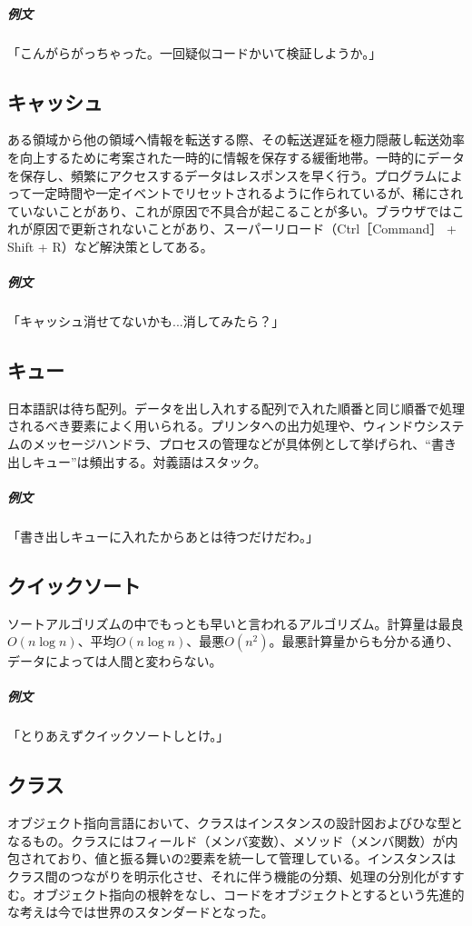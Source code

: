 \documentclass[dvipdfmx,jb5]{jreport}
\begin{document}
\subparagraph{例文} 「こんがらがっちゃった。一回疑似コードかいて検証しようか。」

\subsection{キャッシュ}
ある領域から他の領域へ情報を転送する際、その転送遅延を極力隠蔽し転送効率を向上するために考案された一時的に情報を保存する緩衝地帯。一時的にデータを保存し、頻繁にアクセスするデータはレスポンスを早く行う。プログラムによって一定時間や一定イベントでリセットされるように作られているが、稀にされていないことがあり、これが原因で不具合が起こることが多い。ブラウザではこれが原因で更新されないことがあり、スーパーリロード（Ctrl［Command］ + Shift + R）など解決策としてある。

\subparagraph{例文} 「キャッシュ消せてないかも...消してみたら？」

\subsection{キュー}
日本語訳は待ち配列。データを出し入れする配列で入れた順番と同じ順番で処理されるべき要素によく用いられる。プリンタへの出力処理や、ウィンドウシステムのメッセージハンドラ、プロセスの管理などが具体例として挙げられ、``書き出しキュー''は頻出する。対義語はスタック。

\subparagraph{例文} 「書き出しキューに入れたからあとは待つだけだわ。」

\subsection{クイックソート}
ソートアルゴリズムの中でもっとも早いと言われるアルゴリズム。計算量は最良$O(n\log n)$、平均$O(n\log n)$、最悪$O(n^2)$。最悪計算量からも分かる通り、データによっては人間と変わらない。

\subparagraph{例文} 「とりあえずクイックソートしとけ。」

\subsection{クラス}
オブジェクト指向言語において、クラスはインスタンスの設計図およびひな型となるもの。クラスにはフィールド（メンバ変数）、メソッド（メンバ関数）が内包されており、値と振る舞いの2要素を統一して管理している。インスタンスはクラス間のつながりを明示化させ、それに伴う機能の分類、処理の分別化がすすむ。オブジェクト指向の根幹をなし、コードをオブジェクトとするという先進的な考えは今では世界のスタンダードとなった。
\\
\end{document}
